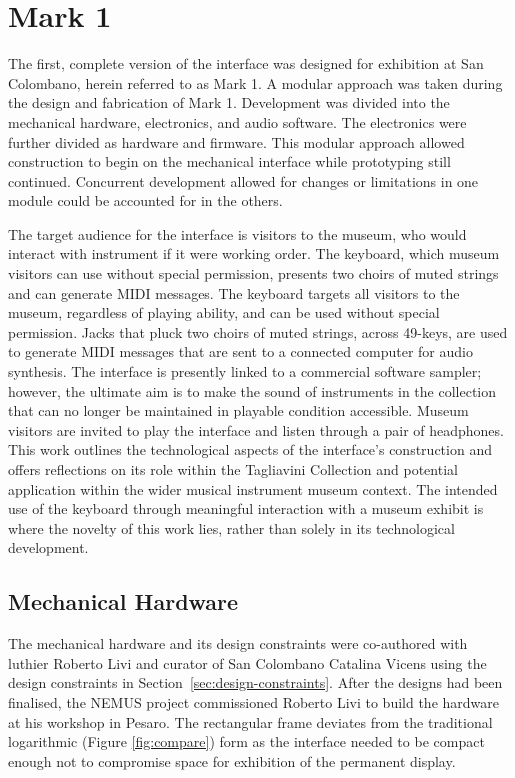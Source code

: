 \section{Mark 1}

The first, complete version of the interface was designed for exhibition at San Colombano, herein referred to as Mark 1.
A modular approach was taken during the design and fabrication of Mark 1. Development was divided into the mechanical hardware, electronics, and audio software. The electronics were further divided as hardware and firmware. This modular approach allowed construction to begin on the mechanical interface while prototyping still continued. Concurrent development allowed for changes or limitations in one module could be accounted for in the others. 

The target audience for the interface is visitors to the
museum, who would interact with instrument if it were working order. The
keyboard, which museum visitors can use without special permission, presents
two choirs of muted strings and can generate MIDI messages. 
The keyboard targets all visitors to the museum, regardless of playing ability,
and can be used without special permission. Jacks that pluck two choirs of muted
strings, across 49-keys, are used to generate MIDI messages that are sent to a
connected computer for audio synthesis. The interface is presently linked to a
commercial software sampler; however, the ultimate aim is to make the sound of
instruments in the collection that can no longer be maintained in playable
condition accessible. Museum visitors are invited to play the interface and
listen through a pair of headphones. This work outlines the technological
aspects of the interface's construction and offers reflections on its role
within the Tagliavini Collection and potential application within the
wider musical instrument museum context. 
The intended use of the keyboard through meaningful interaction with a museum exhibit is where the novelty of this work lies, rather
than solely in its technological development.

\subsection{Mechanical Hardware}

The mechanical hardware and its design constraints were co-authored with luthier Roberto Livi and curator of San Colombano Catalina Vicens using the design constraints in Section~\ref{sec:design-constraints}. After the designs had been finalised, the NEMUS project commissioned Roberto Livi to build the hardware at his workshop in Pesaro. The rectangular frame deviates from the traditional logarithmic (Figure \ref{fig:compare}) form as the interface needed to be compact enough not
to compromise space for exhibition of the permanent display.

